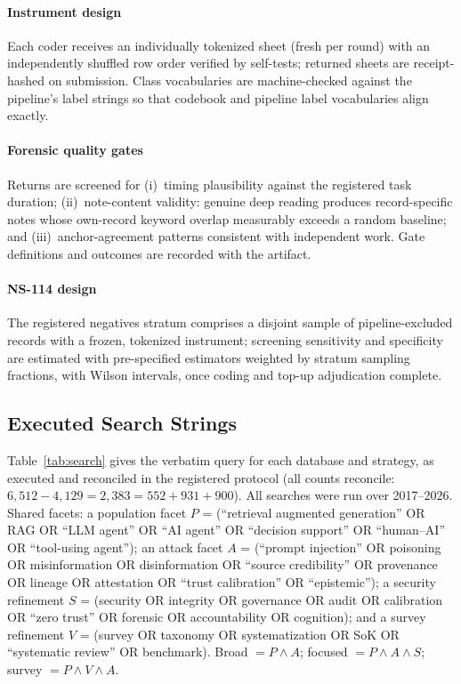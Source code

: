 \documentclass[conference]{IEEEtran}
\begin{document}
\paragraph{Instrument design}
Each coder receives an individually tokenized sheet (fresh per
round) with an independently shuffled row order verified by
self-tests; returned sheets are receipt-hashed on submission.
Class vocabularies are machine-checked against the pipeline's
label strings so that codebook and pipeline label vocabularies
align exactly.
\paragraph{Forensic quality gates}
Returns are screened for (i)~timing plausibility against the
registered task duration; (ii)~note-content validity: genuine deep
reading produces record-specific notes whose own-record keyword
overlap measurably exceeds a random baseline; and (iii)~anchor-agreement patterns consistent with independent work. Gate
definitions and outcomes are recorded with the artifact.
\paragraph{NS-114 design}
The registered negatives stratum comprises a disjoint sample of
pipeline-excluded records with a frozen, tokenized instrument;
screening sensitivity and specificity are estimated with
pre-specified estimators weighted by stratum sampling fractions,
with Wilson intervals, once coding and top-up adjudication
complete.

\subsection{Executed Search Strings}
\label{app:search}
Table~\ref{tab:search} gives the verbatim query for each database
and strategy, as executed and reconciled in the registered
protocol (all counts reconcile:
$6{,}512 - 4{,}129 = 2{,}383 = 552 + 931 + 900$). All searches
were run over 2017--2026. Shared facets: a population facet
$P$ = (``retrieval augmented generation'' OR RAG OR ``LLM agent''
OR ``AI agent'' OR ``decision support'' OR ``human--AI'' OR
``tool-using agent''); an attack facet $A$ = (``prompt injection''
OR poisoning OR misinformation OR disinformation OR ``source
credibility'' OR provenance OR lineage OR attestation OR ``trust
calibration'' OR ``epistemic''); a security refinement $S$ =
(security OR integrity OR governance OR audit OR calibration OR
``zero trust'' OR forensic OR accountability OR cognition); and a
survey refinement $V$ = (survey OR taxonomy OR systematization OR
SoK OR ``systematic review'' OR benchmark). Broad $= P \wedge A$;
focused $= P \wedge A \wedge S$; survey $= P \wedge V \wedge A$.
\end{document}
